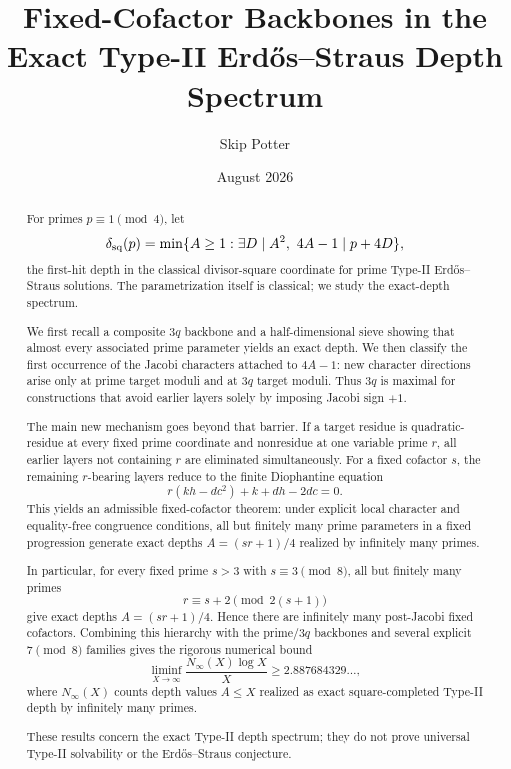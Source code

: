 \documentclass[11pt]{article}
\title{Fixed-Cofactor Backbones in the Exact Type-II Erd\H{o}s--Straus Depth Spectrum}
\author{Skip Potter}
\date{August 2026}
\theoremstyle{definition}
\newcommand{\sqdepth}{\delta_{\rm sq}}
\begin{document}
\maketitle

\begin{abstract}
For primes $p\equiv1\pmod4$, let
\[
\sqdepth(p)=\min\{A\ge1:\exists D\mid A^2,\ 4A-1\mid p+4D\},
\]
the first-hit depth in the classical divisor-square coordinate for prime Type-II Erd\H{o}s--Straus solutions. The parametrization itself is classical; we study the exact-depth spectrum.

We first recall a composite $3q$ backbone and a half-dimensional sieve showing that almost every associated prime parameter yields an exact depth. We then classify the first occurrence of the Jacobi characters attached to $4A-1$: new character directions arise only at prime target moduli and at $3q$ target moduli. Thus $3q$ is maximal for constructions that avoid earlier layers solely by imposing Jacobi sign $+1$.

The main new mechanism goes beyond that barrier. If a target residue is quadratic-residue at every fixed prime coordinate and nonresidue at one variable prime $r$, all earlier layers not containing $r$ are eliminated simultaneously. For a fixed cofactor $s$, the remaining $r$-bearing layers reduce to the finite Diophantine equation
\[
r(kh-dc^2)+k+dh-2dc=0.
\]
This yields an admissible fixed-cofactor theorem: under explicit local character and equality-free congruence conditions, all but finitely many prime parameters in a fixed progression generate exact depths $A=(sr+1)/4$ realized by infinitely many primes.

In particular, for every fixed prime $s>3$ with $s\equiv3\pmod8$, all but finitely many primes
\[
r\equiv s+2\pmod{2(s+1)}
\]
give exact depths $A=(sr+1)/4$. Hence there are infinitely many post-Jacobi fixed cofactors. Combining this hierarchy with the prime/$3q$ backbones and several explicit $7\pmod8$ families gives the rigorous numerical bound
\[
\liminf_{X\to\infty}\frac{N_\infty(X)\log X}{X}\ge2.887684329\ldots,
\]
where $N_\infty(X)$ counts depth values $A\le X$ realized as exact square-completed Type-II depth by infinitely many primes.

These results concern the exact Type-II depth spectrum; they do not prove universal Type-II solvability or the Erd\H{o}s--Straus conjecture.
\end{abstract}
\end{document}
